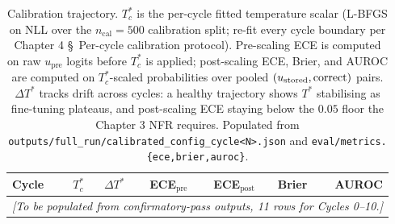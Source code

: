 \begin{table}[t]
\centering
\caption{Calibration trajectory. $T^{*}_c$ is the per-cycle fitted
temperature scalar (L-BFGS on NLL over the $n_{\text{cal}} = 500$
calibration split; re-fit every cycle boundary per Chapter 4
\S~Per-cycle calibration protocol). Pre-scaling
ECE is computed on raw $u_{\text{pre}}$ logits before $T^{*}_c$
is applied; post-scaling ECE, Brier, and AUROC are computed on
$T^{*}_c$-scaled probabilities over pooled
$(u_{\text{stored}}, \mathrm{correct})$ pairs. $\Delta T^{*}$ tracks
drift across cycles: a healthy trajectory shows $T^{*}$ stabilising
as fine-tuning plateaus, and post-scaling ECE staying below the
$0.05$ floor the Chapter 3 NFR requires. Populated from
\texttt{outputs/full\_run/calibrated\_config\_cycle<N>.json} and
\texttt{eval/metrics.\{ece,brier,auroc\}}.}
\label{tab:calibration}
\begin{tabular}{lrrrrrr}
\toprule
Cycle & $T^{*}_c$ & $\Delta T^{*}$ & ECE$_{\text{pre}}$ & ECE$_{\text{post}}$ & Brier & AUROC \\
\midrule
\multicolumn{7}{c}{\emph{[To be populated from confirmatory-pass outputs, 11 rows for Cycles 0--10.]}}\\
\bottomrule
\end{tabular}
\end{table}

